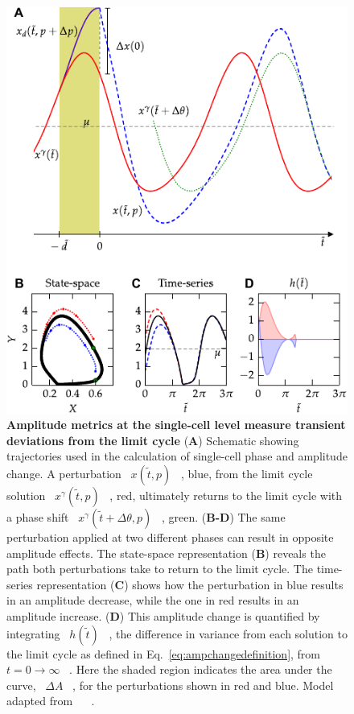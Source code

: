 \documentclass[11pt, letterpaper]{article}
\providecommand{\DIFadd}[1]{{\protect\color{blue}#1}} %
\providecommand{\DIFaddbegin}{} %
\providecommand{\DIFaddFL}[1]{\DIFadd{#1}} %
\begin{document}
\DIFaddbegin \begin{figure}[tbp]
  \begin{center}
    \includegraphics[width=.75\textwidth]{figures/figure_1.pdf}
  \end{center}
  \caption{\DIFaddFL{
{}\bfseries \DIFaddFL{Amplitude metrics at the single-cell level measure transient deviations from the limit cycle}} \DIFaddFL{(}{\bfseries \DIFaddFL{A}}\DIFaddFL{) Schematic showing trajectories used in the calculation of single-cell phase and amplitude change.
A perturbation \mbox{%
$x(\tilde{t},p)$
}%
, blue, from the limit cycle solution \mbox{%
$x^\gamma(\tilde{t},p)$
}%
, red, ultimately returns to the limit cycle with a phase shift \mbox{%
$x^\gamma(\tilde{t} + \Delta\theta,p)$
}%
, green.
(}{\bfseries \DIFaddFL{B-D}}\DIFaddFL{) The same perturbation applied at two different phases can result in opposite amplitude effects.
The state-space representation (}{\bfseries \DIFaddFL{B}}\DIFaddFL{) reveals the path both perturbations take to return to the limit cycle.
The time-series representation (}{\bfseries \DIFaddFL{C}}\DIFaddFL{) shows how the perturbation in blue results in an amplitude decrease, while the one in red results in an amplitude increase.
(}{\bfseries \DIFaddFL{D}}\DIFaddFL{) This amplitude change is quantified by integrating \mbox{%
$h(\tilde{t})$
}%
, the difference in variance from each solution to the limit cycle as defined in Eq.~\ref{eq:ampchangedefinition}, from \mbox{%
$t=0 \to \infty$
}%
.
Here the shaded region indicates the area under the curve, \mbox{%
$\Delta A$
}%
, for the perturbations shown in red and blue.
Model adapted from \mbox{%
\cite{Novak2008}
}%
.
}} \end{figure}
\end{document}
